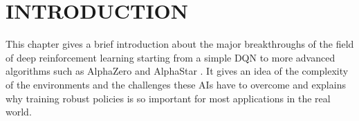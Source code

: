 
\chapter{INTRODUCTION}
\label{introduction}

This chapter gives a brief introduction about the major breakthroughs of the field of deep reinforcement learning starting from a simple DQN \cite{mnih2013playing} to more advanced algorithms such as AlphaZero \cite{silver2017mastering} and AlphaStar \cite{Arulkumaran_2019}. It gives an idea of the complexity of the environments and the challenges these AIs have to overcome and explains why training robust policies is so important for most applications in the real world.    

